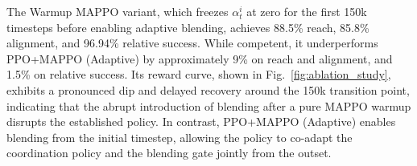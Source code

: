 \documentclass[a4paper,fleqn]{cas-dc}
\begin{document}
The Warmup MAPPO variant, which freezes $\alpha^{i}_{t}$ at zero for the first 150k timesteps before enabling adaptive blending, achieves 88.5\% reach, 85.8\% alignment, and 96.94\% relative success. While competent, it underperforms PPO+MAPPO (Adaptive) by approximately 9\% on reach and alignment, and 1.5\% on relative success. Its reward curve, shown in Fig.~\ref{fig:ablation_study}, exhibits a pronounced dip and delayed recovery around the 150k transition point, indicating that the abrupt introduction of blending after a pure MAPPO warmup disrupts the established policy. In contrast, PPO+MAPPO (Adaptive) enables blending from the initial timestep, allowing the policy to co-adapt the coordination policy and the blending gate jointly from the outset.

\begin{table}[h]
\caption{Seed robustness of PPO+MAPPO (Adaptive) and of the $\alpha$-detached control. Each seed evaluated over 10 independent trials across 4,096 parallel environments (Mean $\pm$ Std across trials). Each block's final row reports Mean $\pm$ Std across the three training seeds.}
\centering
{}
\label{tab:seed_robustness}
\end{table}
\end{document}
